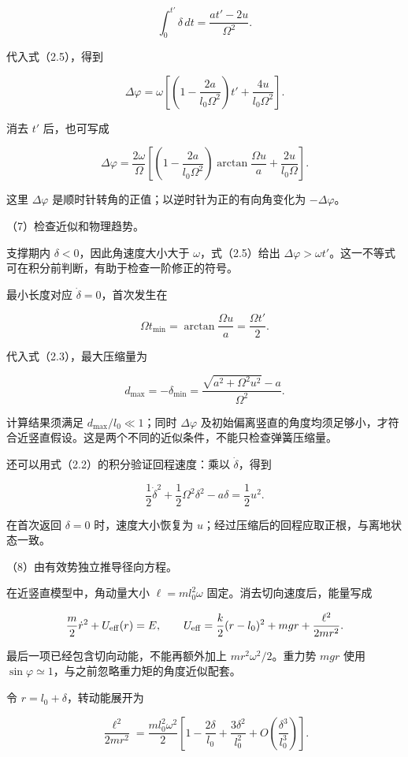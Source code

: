 \documentclass[12pt,a4paper,fontset=fandol]{ctexart}
\begin{document}
\[
\int_0^{t'}\delta\,dt=\frac{at'-2u}{\Omega^2}.
\]

代入式（2.5），得到

\[
\boxed{\Delta\varphi
=\omega\left[\left(1-\frac{2a}{l_0\Omega^2}\right)t'
+\frac{4u}{l_0\Omega^2}\right].}
\tag{2.6}
\]

消去 \(t'\) 后，也可写成

\[
\boxed{\Delta\varphi=\frac{2\omega}{\Omega}
\left[\left(1-\frac{2a}{l_0\Omega^2}\right)
\arctan\frac{\Omega u}{a}+\frac{2u}{l_0\Omega}\right].}
\]

这里 \(\Delta\varphi\) 是顺时针转角的正值；以逆时针为正的有向角变化为
\(-\Delta\varphi\)。

（7）检查近似和物理趋势。

支撑期内 \(\delta<0\)，因此角速度大小大于 \(\omega\)，式（2.5）给出
\(\Delta\varphi>\omega t'\)。这一不等式可在积分前判断，有助于检查一阶修正的符号。

最小长度对应 \(\dot\delta=0\)，首次发生在

\[
\Omega t_{\min}=\arctan\frac{\Omega u}{a}=\frac{\Omega t'}2.
\]

代入式（2.3），最大压缩量为

\[
d_{\max}=-\delta_{\min}
=\frac{\sqrt{a^2+\Omega^2u^2}-a}{\Omega^2}.
\tag{2.7}
\]

计算结果须满足 \(d_{\max}/l_0\ll1\)；同时 \(\Delta\varphi\)
及初始偏离竖直的角度均须足够小，才符合近竖直假设。这是两个不同的近似条件，不能只检查弹簧压缩量。

还可以用式（2.2）的积分验证回程速度：乘以 \(\dot\delta\)，得到

\[
\frac12\dot\delta^2+\frac12\Omega^2\delta^2-a\delta=\frac12u^2.
\]

在首次返回 \(\delta=0\) 时，速度大小恢复为
\(u\)；经过压缩后的回程应取正根，与离地状态一致。

（8）由有效势独立推导径向方程。

在近竖直模型中，角动量大小 \(\ell=ml_0^2\omega\)
固定。消去切向速度后，能量写成

\[
\frac m2\dot r^2+U_{\rm eff}(r)=E,
\qquad
U_{\rm eff}=\frac{k}{2}(r-l_0)^2+mgr+\frac{\ell^2}{2mr^2}.
\]

最后一项已经包含切向动能，不能再额外加上 \(mr^2\omega^2/2\)。重力势
\(mgr\) 使用 \(\sin\varphi\simeq1\)，与之前忽略重力矩的角度近似配套。

令 \(r=l_0+\delta\)，转动能展开为

\[
\frac{\ell^2}{2mr^2}
=\frac{ml_0^2\omega^2}{2}
\left[1-\frac{2\delta}{l_0}
+\frac{3\delta^2}{l_0^2}
+O\left(\frac{\delta^3}{l_0^3}\right)\right].
\]
\end{document}
